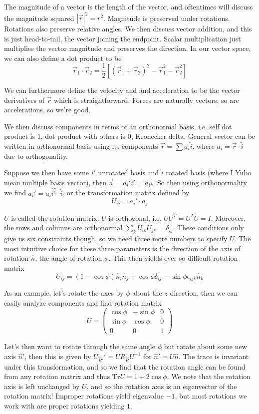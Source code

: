 \documentclass[10pt]{report}
\newcommand{\abs}[1]{\left|#1\right|}
\begin{document}
The magnitude of a vector is the length of the vector, and oftentimes will discuss the magnitude squared $\abs{\vec{r}}^2 = r^2$. Magnitude is preserved under rotations. Rotations also preserve relative angles. We then discuss vector addition, and this is just head-to-tail, the vector joining the endpoint. Scalar multiplication just multiplies the vector magnitude and preserves the direction. In our vector space, we can also define a dot product to be 
$$\vec{r}_1 \cdot \vec{r}_2 = \frac{1}{2}\left[ \left( \vec{r}_1 + \vec{r}_2 \right)^2 - \vec{r}_1^2 - \vec{r}_2^2 \right]$$

We can furthermore define the velocity and and acceleration to be the vector derivatives of $\vec{r}$ which is straightforward. Forces are naturally vectors, so are accelerations, so we're good.

We then discuss components in terms of an orthonormal basis, i.e. self dot product is 1, dot product with others is 0, Kronecker delta. General vector can be written in orthonormal basis using its components $\vec{r} = \sum a_i\hat{i}$, where $a_i = \vec{r} \cdot \hat{i}$ due to orthogonality. 

Suppose we then have some $\hat{i}'$ unrotated basis and $\hat{i}$ rotated basis (where I Yubo mean multiple basis vector), then $\vec{a} = a_i' \hat{i}' = a_i \hat{i}$. So then using orthonormality we find $a_i' = a_i\hat{i'}\cdot \hat{i}$, or the transformation matrix defined by
$$U_{ij} = a_i'\cdot a_j$$

$U$ is called the rotation matrix. $U$ is orthogonal, i.e. $UU^T = U^TU = I$. Moreover, the rows and columns are orthonormal $\sum_k U_{ik}U_{jk} = \delta_{ij}$. These conditions only give us six constraints though, so we need three more numbers to specify $U$. The most intuitive choice for these three parameters is the direction of the axis of rotation $\hat{n}$, the angle of rotation $\phi$. This then yields ever so difficult rotation matrix
$$U_{ij} = (1-\cos \phi)\hat{n}_i\hat{n}_j + \cos \phi \delta_{ij} - \sin\phi\epsilon_{ijk}\hat{n}_k$$

As an example, let's rotate the axes by $\phi$ about the $z$ direction, then we can easily analyze components and find rotation matrix
$$U = \begin{pmatrix}\cos \phi & -\sin \phi & 0\\\sin \phi & \cos \phi & 0\\0 & 0 & 1\end{pmatrix}$$

Let's then want to rotate through the same angle $\phi$ but rotate about some new axis $\hat{n}'$, then this is given by $U_{\hat{R}'}' = UR_{\hat{R}}U^{-1}$ for $\hat{n}' = U\hat{n}$. The trace is invariant under this transformation, and so we find that the rotation angle can be found from any rotation matrix and thus $\mathrm{Tr} U = 1+2\cos \phi$. We note that the rotation axis is left unchanged by $U$, and so the rotation axis is an eigenvector of the rotation matrix! Improper rotations yield eigenvalue $-1$, but most rotations we work with are proper rotations yielding $1$.
\end{document}
